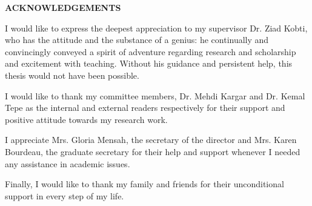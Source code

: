 \newpage
{}

\begin{center}
\textbf{ACKNOWLEDGEMENTS}
\end{center}

I would like to express the deepest appreciation to my supervisor Dr. Ziad Kobti, who has the attitude and the substance of a genius: he continually and convincingly conveyed a spirit of adventure regarding research and scholarship and excitement with teaching. Without his guidance and persistent help, this thesis would not have been possible.
\newline
\par I would like to thank my committee members, Dr. Mehdi Kargar and Dr. Kemal Tepe as the internal and external readers respectively for their support and positive attitude towards my research work.
\newline
\par I appreciate Mrs. Gloria Mensah, the secretary of the director and Mrs. Karen Bourdeau, the graduate secretary for their help and support whenever I needed any assistance in academic issues.
\par Finally, I would like to thank my family and friends for their unconditional support in every step of my life.
\newpage
%
